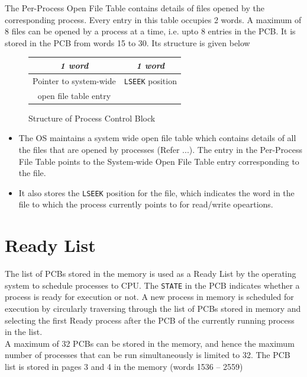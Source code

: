 \documentclass[10pt]{report}
\begin{document}
	  The Per-Process Open File Table contains details of files opened by the corresponding process. Every entry in this table occupies 2 words. A maximum of 8 files can be opened by a process at a time, i.e. upto 8 entries in the PCB. It is stored in the PCB from words 15 to 30. Its structure is given below


		\begin{figure}[htp!]
		\centering
		\begin{tabular}{|c|c|}
			\textit{1 word} & \textit{1 word} \\
			\hline
			Pointer to system-wide & \texttt{LSEEK} position\\ open file table entry &  \\
			\hline
		\end{tabular}
		\caption{Structure of Process Control Block}
	\end{figure}
\begin{itemize}
\item
The OS maintains a system wide open file table which contains details of all the files that are opened by processes (Refer ...). The entry in the Per-Process File Table points to the System-wide Open File Table entry corresponding to the file. 
\item It also stores the \texttt{LSEEK} position for the file, which indicates the word in the file to which the process currently points to for read/write opeartions. 
\end{itemize}




\section{Ready List}
\label{lbl:rdylst}

The list of PCBs stored in the memory is used as a Ready List by the operating system to schedule processes to CPU. The \texttt{STATE} in the PCB indicates whether a process is ready for execution or not.  A new process in memory is scheduled for execution by circularly traversing through the list of PCBs stored in memory and selecting the first Ready process after the PCB of the currently running process in the list.\\

A maximum of 32 PCBs can be stored in the memory, and hence the maximum number of processes that can be run simultaneously is limited to 32. The PCB list is stored in pages 3 and 4 in the memory (words 1536 -- 2559)
\end{document}
